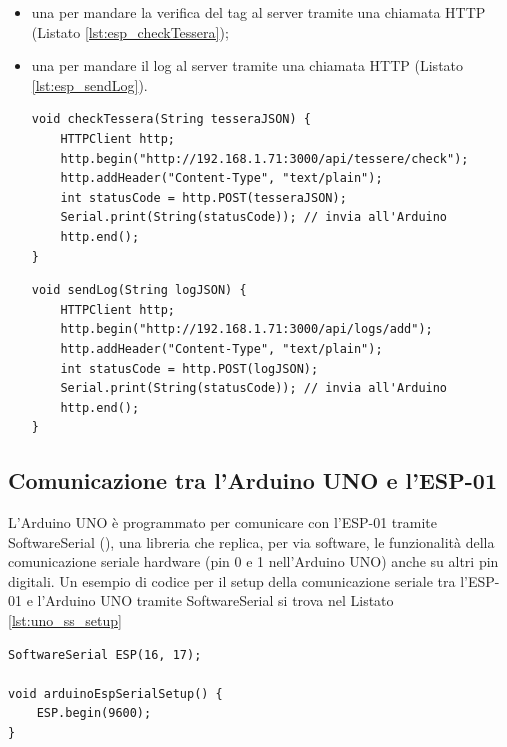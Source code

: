 \documentclass[12pt]{report}
\begin{document}
\begin{itemize}
	\item una per mandare la verifica del tag al server tramite una chiamata HTTP (Listato \ref{lst:esp_checkTessera});
	\item una per mandare il log al server tramite una chiamata HTTP (Listato \ref{lst:esp_sendLog}).
	
\begin{lstlisting}[caption={L'ESP-01 manda una richiesta POST all'endpoint specificato. Il corpo della richiesta è in formato JSON e include il seriale e il tipo della tessera che si vuole verificare.}, label={lst:esp_checkTessera}, xleftmargin=\dimexpr-\leftmargini]
void checkTessera(String tesseraJSON) {
	HTTPClient http;
	http.begin("http://192.168.1.71:3000/api/tessere/check");
	http.addHeader("Content-Type", "text/plain");
	int statusCode = http.POST(tesseraJSON);
	Serial.print(String(statusCode)); // invia all'Arduino
	http.end();
}
\end{lstlisting}
\begin{lstlisting}[caption={L'ESP-01 manda una richiesta POST all'endpoint specificato. Il corpo della richiesta è in formato JSON e rappresenta il log.}, label={lst:esp_sendLog}, xleftmargin=\dimexpr-\leftmargini]
void sendLog(String logJSON) {
	HTTPClient http;
	http.begin("http://192.168.1.71:3000/api/logs/add");
	http.addHeader("Content-Type", "text/plain");
	int statusCode = http.POST(logJSON);
	Serial.print(String(statusCode)); // invia all'Arduino
	http.end();
}
\end{lstlisting}

\end{itemize}

\subsection{Comunicazione tra l'Arduino UNO e l'ESP-01 }

L'Arduino UNO è programmato per comunicare con l'ESP-01 tramite SoftwareSerial (\cite{softwareserial_lib}), una libreria che replica, per via software, le funzionalità della comunicazione seriale hardware (pin 0 e 1 nell'Arduino UNO) anche su altri pin digitali. Un esempio di codice per il setup della comunicazione seriale tra l'ESP-01 e l'Arduino UNO tramite SoftwareSerial si trova nel Listato \ref{lst:uno_ss_setup}
\begin{lstlisting}[caption={Inizializzazione della comunicazione seriale tra Arduino UNO e ESP-01}, label={lst:uno_ss_setup}]
SoftwareSerial ESP(16, 17);

void arduinoEspSerialSetup() {
	ESP.begin(9600);
}
\end{lstlisting}
\end{document}
